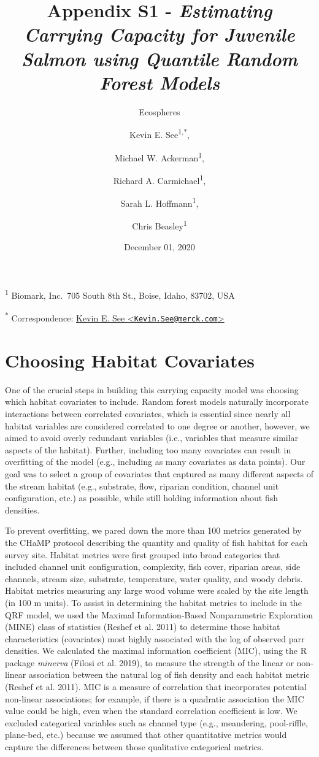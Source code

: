 \documentclass[
  12pt,
]{article}
\title{Appendix S1 - \emph{Estimating Carrying Capacity for Juvenile Salmon using Quantile Random Forest Models}}
\subtitle{Ecospheres}
\author{Kevin E. See\textsuperscript{1,*}, 
    \and Michael W. Ackerman\textsuperscript{1}, 
    \and Richard A. Carmichael\textsuperscript{1},
    \and Sarah L. Hoffmann\textsuperscript{1}, 
    \and Chris Beasley\textsuperscript{1}}
\date{December 01, 2020}
\begin{document}
\maketitle

\textsuperscript{1} Biomark, Inc.~705 South 8th St., Boise, Idaho, 83702, USA

\textsuperscript{*} Correspondence: \href{mailto:Kevin.See@merck.com}{Kevin E. See \textless{}\href{mailto:Kevin.See@merck.com}{\nolinkurl{Kevin.See@merck.com}}\textgreater{}}

\hypertarget{choosing-habitat-covariates}{%
\section{Choosing Habitat Covariates}\label{choosing-habitat-covariates}}

One of the crucial steps in building this carrying capacity model was choosing which habitat covariates to include. Random forest models naturally incorporate interactions between correlated covariates, which is essential since nearly all habitat variables are considered correlated to one degree or another, however, we aimed to avoid overly redundant variables (i.e., variables that measure similar aspects of the habitat). Further, including too many covariates can result in overfitting of the model (e.g., including as many covariates as data points). Our goal was to select a group of covariates that captured as many different aspects of the stream habitat (e.g., substrate, flow, riparian condition, channel unit configuration, etc.) as possible, while still holding information about fish densities.

To prevent overfitting, we pared down the more than 100 metrics generated by the CHaMP protocol describing the quantity and quality of fish habitat for each survey site. Habitat metrics were first grouped into broad categories that included channel unit configuration, complexity, fish cover, riparian areas, side channels, stream size, substrate, temperature, water quality, and woody debris. Habitat metrics measuring any large wood volume were scaled by the site length (in 100 m units). To assist in determining the habitat metrics to include in the QRF model, we used the Maximal Information-Based Nonparametric Exploration (MINE) class of statistics (Reshef et al. 2011) to determine those habitat characteristics (covariates) most highly associated with the log of observed parr densities. We calculated the maximal information coefficient (MIC), using the R package \emph{minerva} (Filosi et al. 2019), to measure the strength of the linear or non-linear association between the natural log of fish density and each habitat metric (Reshef et al. 2011). MIC is a measure of correlation that incorporates potential non-linear associations; for example, if there is a quadratic association the MIC value could be high, even when the standard correlation coefficient is low. We excluded categorical variables such as channel type (e.g., meandering, pool-riffle, plane-bed, etc.) because we assumed that other quantitative metrics would capture the differences between those qualitative categorical metrics.
\end{document}

